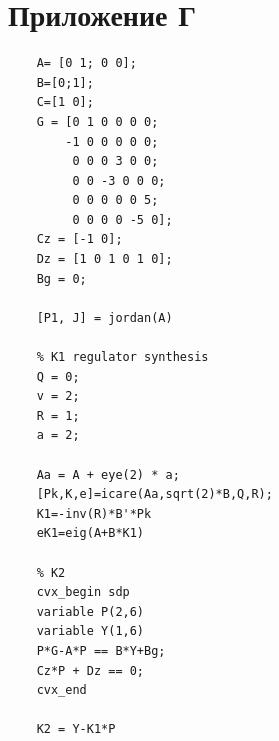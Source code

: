 \documentclass[a4paper, 12pt]{article}
\begin{document}
    \section{Приложение Г}
    \begin{lstlisting}[label=task4, caption={Программа для задания 4}]
    % plant parameters
    A= [0 1; 0 0];
    B=[0;1];
    C=[1 0];
    G = [0 1 0 0 0 0;
        -1 0 0 0 0 0;
         0 0 0 3 0 0;
         0 0 -3 0 0 0;
         0 0 0 0 0 5;
         0 0 0 0 -5 0];
    Cz = [-1 0];
    Dz = [1 0 1 0 1 0];
    Bg = 0;

    [P1, J] = jordan(A)

    % K1 regulator synthesis
    Q = 0;
    v = 2;
    R = 1;
    a = 2;

    Aa = A + eye(2) * a;
    [Pk,K,e]=icare(Aa,sqrt(2)*B,Q,R);
    K1=-inv(R)*B'*Pk
    eK1=eig(A+B*K1)

    % K2
    cvx_begin sdp
    variable P(2,6)
    variable Y(1,6)
    P*G-A*P == B*Y+Bg;
    Cz*P + Dz == 0;
    cvx_end

    K2 = Y-K1*P
    \end{lstlisting}
\end{document}
